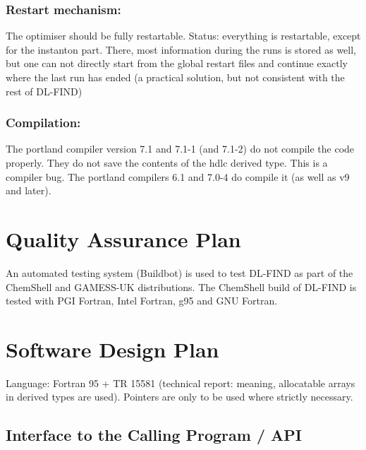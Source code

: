 \documentclass{article}
\begin{document}
\subsubsection{Restart mechanism:}

The optimiser should be fully restartable. Status: everything is
restartable, except for the instanton part. There, most information
during the runs is stored as well, but one can not directly start from
the global restart files and continue exactly where the last run has
ended (a practical solution, but not consistent with the rest of DL-FIND)

\subsubsection{Compilation:} The portland compiler version 7.1 and 7.1-1 (and
7.1-2) do not compile the code properly. They do not save the contents of the
hdlc derived type. This is a compiler bug. The portland compilers 6.1 and
7.0-4 do compile it (as well as v9 and later).

\section{Quality Assurance Plan}

An automated testing system (Buildbot) is used to test DL-FIND as part 
of the ChemShell and GAMESS-UK distributions. 
The ChemShell build of DL-FIND is tested with PGI Fortran, Intel Fortran, g95 and GNU Fortran.

\section{Software Design Plan}

Language: Fortran 95 + TR 15581 (technical report: meaning, allocatable arrays
in derived types are used). Pointers are only to be used where strictly
necessary.

\subsection{Interface to the Calling Program / API \label{sec:interface}}
\end{document}

